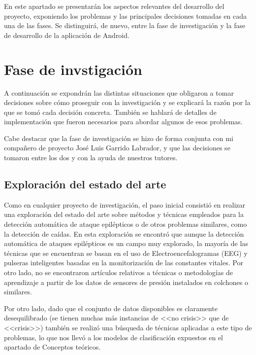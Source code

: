 
En este apartado se presentarán los aspectos relevantes del desarrollo del proyecto, exponiendo los problemas y las principales decisiones tomadas en cada una de las fases. Se distinguirá, de nuevo, entre la fase de investigación y la fase de desarrollo de la aplicación de Android. 

\section{Fase de invstigación}

A continuación se expondrán las distintas situaciones que obligaron a tomar decisiones sobre cómo proseguir con la investigación y se explicará la razón por la que se tomó cada decisión concreta. También se hablará de detalles de implementación que fueron necesarios para abordar algunos de esos problemas. 

Cabe destacar que la fase de investigación se hizo de forma conjunta con mi compañero de proyecto José Luis Garrido Labrador, y que las decisiones se tomaron entre los dos y con la ayuda de nuestros tutores. 

\subsection{Exploración del estado del arte}

Como en cualquier proyecto de investigación, el paso inicial consistió en realizar una exploración del estado del arte sobre métodos y técnicas empleados para la detección automática de ataque epilépticos o de otros problemas similares, como la detección de caídas. En esta exploración se encontró que aunque la detección automática de ataques epilépticos es un campo muy explorado, la mayoría de las técnicas que se encuentran se basan en el uso de Electroencefalogramas (EEG) y pulseras inteligentes basadas en la monitorización de las constantes vitales. Por otro lado, no se encontraron artículos relativos a técnicas o metodologías de aprendizaje a partir de los datos de sensores de presión instalados en colchones o similares.

Por otro lado, dado que el conjunto de datos disponibles es claramente desequilibrado (se tienen muchas más instancias de <<no crisis>> que de <<crisis>>) también se realizó una búsqueda de técnicas aplicadas a este tipo de problemas, lo que nos llevó a los modelos de clasificación expuestos en el apartado de Conceptos teóricos. 

